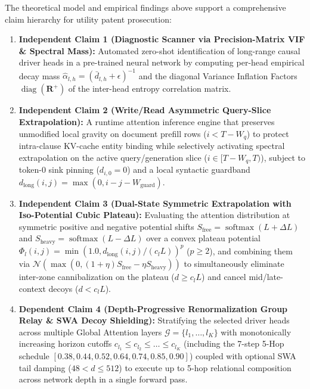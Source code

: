 \documentclass[11pt,letterpaper]{article}
\theoremstyle{definition}
\begin{document}
The theoretical model and empirical findings above support a comprehensive claim hierarchy for utility patent prosecution:
\begin{enumerate}
    \item \textbf{Independent Claim 1 (Diagnostic Scanner via Precision-Matrix VIF \& Spectral Mass):} Automated zero-shot identification of long-range causal driver heads in a pre-trained neural network by computing per-head empirical decay mass $\hat{\alpha}_{l,h} = (\bar{d}_{l,h} + \epsilon)^{-1}$ and the diagonal Variance Inflation Factors $\operatorname{diag}(\mathbf{R}^+)$ of the inter-head entropy correlation matrix.
    \item \textbf{Independent Claim 2 (Write/Read Asymmetric Query-Slice Extrapolation):} A runtime attention inference engine that preserves unmodified local gravity on document prefill rows ($i < T - W_q$) to protect intra-clause KV-cache entity binding while selectively activating spectral extrapolation on the active query/generation slice ($i \in [T - W_q, T)$), subject to token-0 sink pinning ($d_{i,0} = 0$) and a local syntactic guardband $d_{\text{long}}(i,j) = \max(0, i - j - W_{\text{guard}})$.
    \item \textbf{Independent Claim 3 (Dual-State Symmetric Extrapolation with Iso-Potential Cubic Plateau):} Evaluating the attention distribution at symmetric positive and negative potential shifts $S_{\text{free}} = \operatorname{softmax}(L + \Delta L)$ and $S_{\text{heavy}} = \operatorname{softmax}(L - \Delta L)$ over a convex plateau potential $\Phi_l(i,j) = \min(1.0, d_{\text{long}}(i,j) / (c_l L))^p$ ($p \ge 2$), and combining them via $\mathcal{N}(\max(0, (1+\eta)S_{\text{free}} - \eta S_{\text{heavy}}))$ to simultaneously eliminate inter-zone cannibalization on the plateau ($d \ge c_l L$) and cancel mid/late-context decoys ($d < c_l L$).
    \item \textbf{Dependent Claim 4 (Depth-Progressive Renormalization Group Relay \& SWA Decoy Shielding):} Stratifying the selected driver heads across multiple Global Attention layers $\mathcal{G} = \{l_1, \dots, l_K\}$ with monotonically increasing horizon cutoffs $c_{l_1} \le c_{l_2} \le \dots \le c_{l_K}$ (including the 7-step 5-Hop schedule $[0.38, 0.44, 0.52, 0.64, 0.74, 0.85, 0.90]$) coupled with optional SWA tail damping ($48 < d \le 512$) to execute up to 5-hop relational composition across network depth in a single forward pass.
\end{enumerate}
\end{document}

